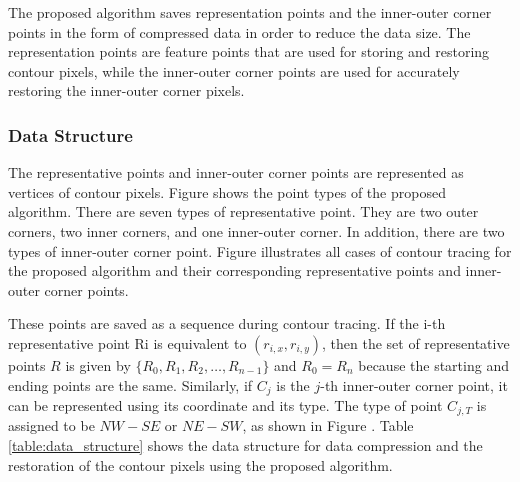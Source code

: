  The proposed algorithm saves representation points and the inner-outer corner points in the form of compressed data in order to reduce the data size. The representation points are feature points that are used for storing and restoring contour pixels, while the inner-outer corner points are used for accurately restoring the inner-outer corner pixels. 

 \subsubsection{Data Structure}

 The representative points and inner-outer corner points are represented as vertices of contour pixels. Figure  shows the point types of the proposed algorithm. There are seven types of representative point. They are two outer corners, two inner corners, and one inner-outer corner. In addition, there are two types of inner-outer corner point. Figure  illustrates all cases of contour tracing for the proposed algorithm and their corresponding representative points and inner-outer corner points. 


 These points are saved as a sequence during contour tracing. If the i-th representative point Ri is equivalent to $(r_{i,x}, r_{i,y})$, then the set of representative points $R$ is given by $\{R_0, R_1, R_2, … , R_{n-1}\}$ and $R_0 = R_n$ because the starting and ending points are the same. Similarly, if $C_j$ is the $j$-th inner-outer corner point, it can be represented using its coordinate and its type. The type of point $C_{j,T}$ is assigned to be $NW-SE$ or $NE-SW$, as shown in Figure . Table \ref{table:data_structure} shows the data structure for data compression and the restoration of the contour pixels using the proposed algorithm. 

